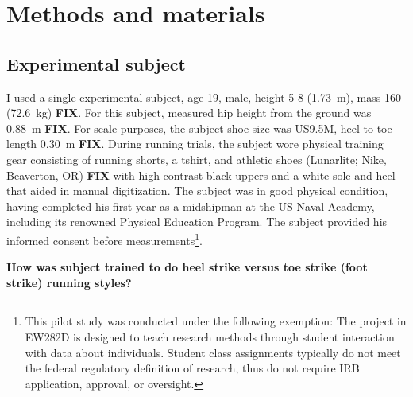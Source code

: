 \section{Methods and materials}
\label{sec:methods}

\subsection{Experimental subject}
I used a single experimental subject, age \SI{19}{\year}, male, height \SI{5}{\foot} \SI{8}{\inch} (\SI{1.73}{\meter}), mass \SI{160}{\pound} (\SI{72.6}{\kilo\gram}) \textbf{FIX}. For this subject, measured hip height from the ground was \SI{0.88}{\meter} \textbf{FIX}. For scale purposes, the subject shoe size was US9.5M, heel to toe length \SI{0.30}{\meter} \textbf{FIX}. During running trials, the subject wore physical training  gear consisting of running shorts, a tshirt, and athletic shoes (Lunarlite; Nike, Beaverton, OR) \textbf{FIX} with high contrast black uppers and a white sole and heel that aided in manual digitization. The subject was in good physical condition, having completed his first year as a midshipman at the US Naval Academy, including its renowned Physical Education Program. The subject provided his informed consent before measurements\footnote{This pilot study was conducted under the following exemption: The project in EW282D is designed to teach research methods through student interaction with data about individuals. Student class assignments typically do not meet the federal regulatory definition of research, thus do not require IRB application, approval, or oversight.}.  

\textbf{How was subject trained to do heel strike versus toe strike (foot strike) running styles?}



